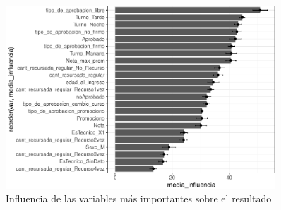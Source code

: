 \begin{figure}[!htb]
	\centering
	\includegraphics[width=0.9\textwidth]{imagenes/variables/influencia_de_variables_23-1.pdf}
	\caption{Influencia de las variables más importantes sobre el resultado}
	\label{fig:rfe_influencia_var_dsalternativa2}
\end{figure}



